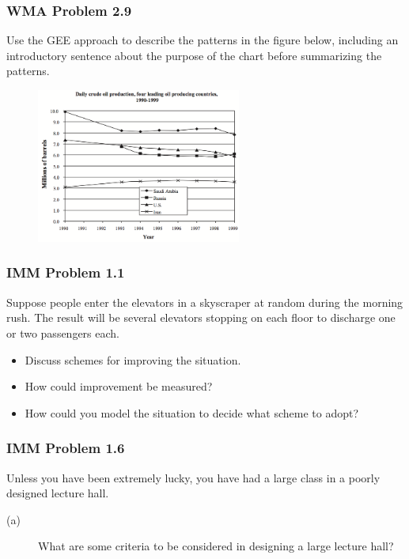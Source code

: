 \begin{frame}
    \frametitle{WMA Problem 2.9}
    Use the GEE approach to describe the patterns in the figure below,
    including an introductory sentence about the purpose of the chart 
    before summarizing the patterns. 
    \begin{figure}
        \begin{center}
            \includegraphics[width=0.6\textwidth]{images/WMAex2x9.png}
        \end{center}
    \end{figure}
\end{frame}

\begin{frame}
    \frametitle{IMM Problem 1.1}
    Suppose people enter the elevators in a skyscraper at random during the
    morning rush. The result will be several elevators stopping on each floor
    to discharge one or two passengers each. 
    \vskip0.1in
    \begin{itemize}
        \item Discuss schemes for improving the situation. 
        \item How could improvement be measured? 
        \item How could you model the situation to decide what scheme to adopt?
    \end{itemize}
\end{frame}

\begin{frame}
    \frametitle{IMM Problem 1.6}
    Unless you have been extremely lucky, you have had a large class in a
    poorly designed lecture hall. 
    
    \vskip0.25in
    \begin{description}
        \item[(a)] What are some criteria to be considered
    in designing a large lecture hall? 
    \end{description}
\end{frame}
    
